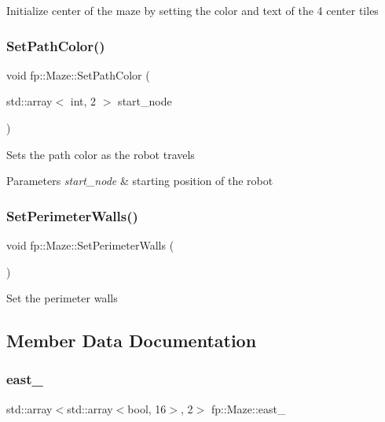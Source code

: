 Initialize center of the maze by setting the color and text of the 4 center tiles \mbox{\label{classfp_1_1_maze_ace62554f667bd404e059bb61166e44f0}} 
\subsubsection{\texorpdfstring{Set\+Path\+Color()}{SetPathColor()}}
{\footnotesize\ttfamily void fp\+::\+Maze\+::\+Set\+Path\+Color (\begin{DoxyParamCaption}\item[{std\+::array$<$ int, 2 $>$}]{start\+\_\+node }\end{DoxyParamCaption})}

Sets the path color as the robot travels 
\begin{DoxyParams}{Parameters}
{\em start\+\_\+node} & starting position of the robot \\
\hline
\end{DoxyParams}
\mbox{\label{classfp_1_1_maze_a689d998d05f671c2644804ee912c5e79}} 
\subsubsection{\texorpdfstring{Set\+Perimeter\+Walls()}{SetPerimeterWalls()}}
{\footnotesize\ttfamily void fp\+::\+Maze\+::\+Set\+Perimeter\+Walls (\begin{DoxyParamCaption}{ }\end{DoxyParamCaption})\hspace{0.3cm}{\ttfamily [static]}}

Set the perimeter walls 

\subsection{Member Data Documentation}
\mbox{\label{classfp_1_1_maze_ac1d6b5fc763eff421af708aa39f2141a}} 
\subsubsection{\texorpdfstring{east\+\_\+}{east\_}}
{\footnotesize\ttfamily std\+::array$<$std\+::array$<$bool, 16$>$, 2$>$ fp\+::\+Maze\+::east\+\_\+}

